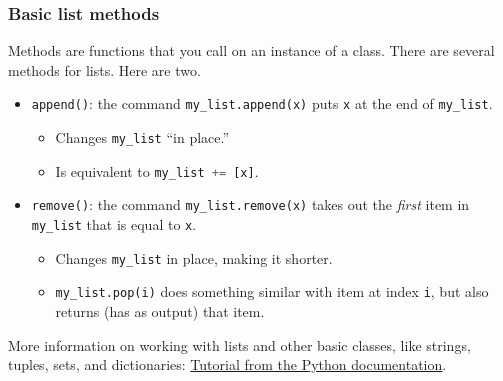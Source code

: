 \documentclass{beamer}
\theoremstyle{example}
\newcommand{\ct}[1]{\lstinline[language=Python,basicstyle=\ttfamily\footnotesize,stringstyle=\small\color{strings}]!#1!}
\newcommand{\ttt}[1]{{\small\texttt{#1}}}
\begin{document}
\begin{frame}
\frametitle{Basic list methods}

Methods are functions that you call on an instance of a class. There are several methods for lists. Here are two.
\pause
\begin{itemize}
	\item \ttt{append()}: the command \ct{my_list.append(x)} puts \ct{x} at the end of \ct{my_list}. 
	\begin{itemize}
		\item Changes \ct{my_list} ``in place.''
		\pause
		\item Is equivalent to \ct{my_list += [x]}.
	\end{itemize}
	\pause
	\item \ttt{remove()}: the command \ct{my_list.remove(x)} takes out the \emph{first} item in \ct{my_list} that is equal to \ct{x}.	
	\begin{itemize}
		\item Changes \ct{my_list} in place, making it shorter.
		\pause
		\item \ct{my_list.pop(i)} does something similar with item at index \ct{i}, but also returns (has as output) that item.
	\end{itemize}
\end{itemize}

More information on working with lists and other basic classes, like strings, tuples, sets, and dictionaries: \href{https://docs.python.org/3/tutorial/datastructures.html}{Tutorial from the Python documentation}.

\end{frame}
\end{document}
